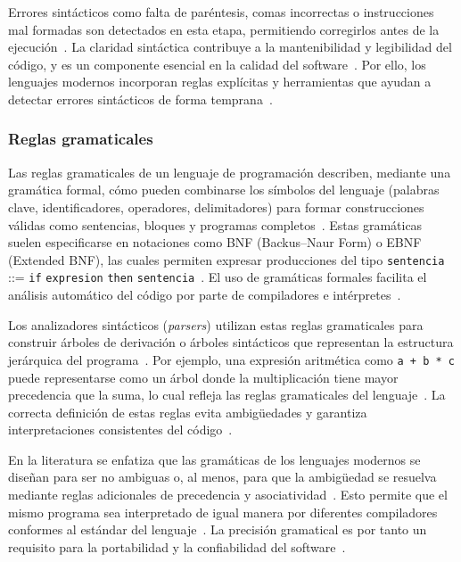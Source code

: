 \documentclass[12pt,twoside]{book}
\begin{document}
					Errores sintácticos como falta de paréntesis, comas incorrectas o instrucciones mal formadas son detectados en esta etapa, permitiendo corregirlos antes de la ejecución~\cite{Pressman2019Software}. La claridad sintáctica contribuye a la mantenibilidad y legibilidad del código, y es un componente esencial en la calidad del software~\cite{Sommerville2015Software}. Por ello, los lenguajes modernos incorporan reglas explícitas y herramientas que ayudan a detectar errores sintácticos de forma temprana~\cite{Stallings2021Computer}.
				
					\subsubsection{Reglas gramaticales}
						Las reglas gramaticales de un lenguaje de programación describen, mediante una gramática formal, cómo pueden combinarse los símbolos del lenguaje (palabras clave, identificadores, operadores, delimitadores) para formar construcciones válidas como sentencias, bloques y programas completos~\cite{Tanenbaum2021Structured}. Estas gramáticas suelen especificarse en notaciones como BNF (Backus–Naur Form) o EBNF (Extended BNF), las cuales permiten expresar producciones del tipo \texttt{sentencia} ::= \texttt{if} \texttt{expresion} \texttt{then} \texttt{sentencia}~\cite{Stallings2021Computer}. El uso de gramáticas formales facilita el análisis automático del código por parte de compiladores e intérpretes~\cite{Sommerville2015Software}.
						
						Los analizadores sintácticos (\emph{parsers}) utilizan estas reglas gramaticales para construir árboles de derivación o árboles sintácticos que representan la estructura jerárquica del programa~\cite{Pressman2019Software}. Por ejemplo, una expresión aritmética como \texttt{a + b * c} puede representarse como un árbol donde la multiplicación tiene mayor precedencia que la suma, lo cual refleja las reglas gramaticales del lenguaje~\cite{Tanenbaum2021Structured}. La correcta definición de estas reglas evita ambigüedades y garantiza interpretaciones consistentes del código~\cite{Stallings2021Computer}.
						
						En la literatura se enfatiza que las gramáticas de los lenguajes modernos se diseñan para ser no ambiguas o, al menos, para que la ambigüedad se resuelva mediante reglas adicionales de precedencia y asociatividad~\cite{Sommerville2015Software}. Esto permite que el mismo programa sea interpretado de igual manera por diferentes compiladores conformes al estándar del lenguaje~\cite{Pressman2019Software}. La precisión gramatical es por tanto un requisito para la portabilidad y la confiabilidad del software~\cite{Stallings2021Computer}.
						
\end{document}
